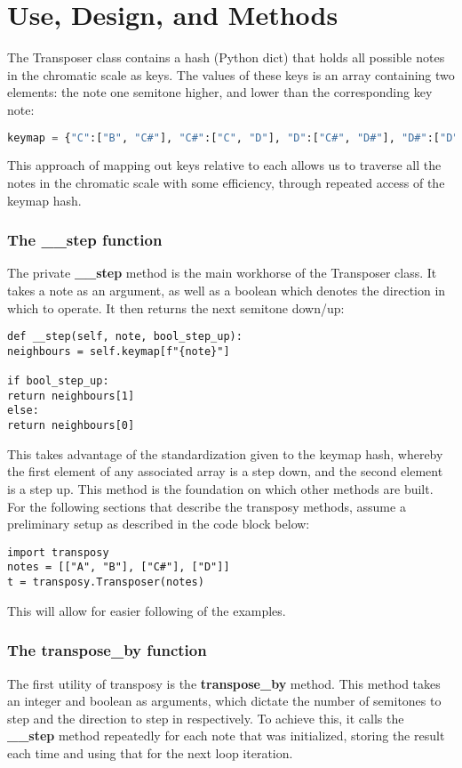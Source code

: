 \documentclass[11pt, a4paper]{article}
\begin{document}
	\section{Use, Design, and Methods}
		The Transposer class contains a hash (Python dict) that holds all possible notes in the chromatic scale as keys. The values of these keys is an array containing two elements: the note one semitone higher, and lower than the corresponding key note:

	\begin{lstlisting}[language=Python]
keymap = {"C":["B", "C#"], "C#":["C", "D"], "D":["C#", "D#"], "D#":["D", "E"], "E":["D#", "F"], "F":["E", "F#"], "F#":["F", "G"], "G":["F#", "G#"], "G#":["G", "A"], "A":["G#", "A#"], "A#":["A", "B"], "B":["A#", "C"]}
	\end{lstlisting}

	This approach of mapping out keys relative to each allows us to traverse all the notes in the chromatic scale with some efficiency, through repeated access of the keymap hash.
	\subsubsection{The \_\_step function}
		The private \textbf{\_\_step} method is the main workhorse of the Transposer class. It takes a note as an argument, as well as a boolean which denotes the direction in which to operate. It then returns the next semitone down/up:

		\begin{lstlisting}
def __step(self, note, bool_step_up):
neighbours = self.keymap[f"{note}"]

if bool_step_up:
return neighbours[1]
else:
return neighbours[0]
		\end{lstlisting}

		This takes advantage of the standardization given to the keymap hash, whereby the first element of any associated array is a step down, and the second element is a step up. This method is the foundation on which other methods are built. For the following sections that describe the transposy methods, assume a preliminary setup as described in the code block below:
		\begin{lstlisting}
import transposy
notes = [["A", "B"], ["C#"], ["D"]]
t = transposy.Transposer(notes)
		\end{lstlisting}

		This will allow for easier following of the examples.


	\subsubsection{The transpose\_by function}
		The first utility of transposy is the \textbf{transpose\_by} method. This method takes an integer and boolean as arguments, which dictate the number of semitones to step and the direction to step in respectively. To achieve this, it calls the \textbf{\_\_step} method repeatedly for each note that was initialized, storing the result each time and using that for the next loop iteration.
\end{document}
